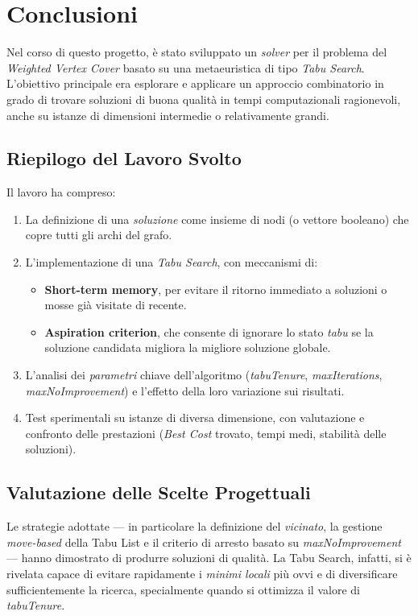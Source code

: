 \section{Conclusioni}
\label{sec:Conclusioni}

Nel corso di questo progetto, è stato sviluppato un \emph{solver} per il problema del \emph{Weighted Vertex Cover} basato su una metaeuristica di tipo \emph{Tabu Search}. L’obiettivo principale era esplorare e applicare un approccio combinatorio in grado di trovare soluzioni di buona qualità in tempi computazionali ragionevoli, anche su istanze di dimensioni intermedie o relativamente grandi.

\subsection*{Riepilogo del Lavoro Svolto}
Il lavoro ha compreso:
\begin{enumerate}
    \item La definizione di una \emph{soluzione} come insieme di nodi (o vettore booleano) che copre tutti gli archi del grafo.
    \item L’implementazione di una \emph{Tabu Search}, con meccanismi di:
    \begin{itemize}
        \item \textbf{Short-term memory}, per evitare il ritorno immediato a soluzioni o mosse già visitate di recente.
        \item \textbf{Aspiration criterion}, che consente di ignorare lo stato \emph{tabu} se la soluzione candidata migliora la migliore soluzione globale.
    \end{itemize}
    \item L’analisi dei \emph{parametri} chiave dell’algoritmo (\emph{tabuTenure}, \emph{maxIterations}, \emph{maxNoImprovement}) e l’effetto della loro variazione sui risultati.
    \item Test sperimentali su istanze di diversa dimensione, con valutazione e confronto delle prestazioni (\emph{Best Cost} trovato, tempi medi, stabilità delle soluzioni).
\end{enumerate}

\subsection*{Valutazione delle Scelte Progettuali}
Le strategie adottate — in particolare la definizione del \emph{vicinato}, la gestione \emph{move-based} della Tabu List e il criterio di arresto basato su \emph{maxNoImprovement} — hanno dimostrato di produrre soluzioni di qualità. La Tabu Search, infatti, si è rivelata capace di evitare rapidamente i \emph{minimi locali} più ovvi e di diversificare sufficientemente la ricerca, specialmente quando si ottimizza il valore di \emph{tabuTenure}.

